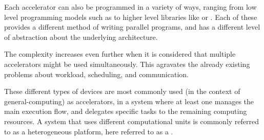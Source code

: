 \documentclass[main.tex]{subfiles}
\begin{document}
Each accelerator can also be programmed in a variety of ways, ranging from low level programming models such as \cuda to higher level libraries like \openmp or \openacc. Each of these provides a different method of writing parallel programs, and has a different level of abstraction about the underlying architecture.

The complexity increases even further when it is considered that multiple accelerators might be used simultaneously. This agravates the already existing problems about workload, scheduling, and communication.


These different types of devices are most commonly used (in the context of general-computing) as accelerators, in a system where at least one \cpu manages the main execution flow, and delegates specific tasks to the remaining computing resources. A system that uses different computational units is commonly referred to as a heterogeneous platform, here referred to as a \hetplat.
\end{document}
